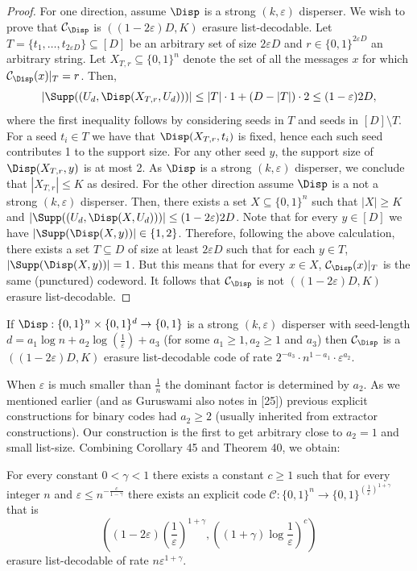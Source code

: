 \begin{proof}
For one direction, assume $\Disp$ is a strong $(k,\varepsilon)$ disperser. We wish to prove that $\mathcal C_{\Disp}$ is $((1-2\varepsilon)D,K)$ erasure list-decodable. Let $T=\{t_1,\ldots,t_{2\varepsilon D}\}\subseteq[D]$ be an arbitrary set of size $2\varepsilon D$ and $r\in\{0,1\}^{2\varepsilon D}$ an arbitrary string. Let $X_{T,r}\subseteq\{0,1\}^n$ denote the set of all the messages $x$ for which $\mathcal C_{\Disp}(x)|_T=r$. Then,
\[|\Supp((U_d,\Disp(X_{T,r},U_d)))|\le|T|\cdot1+(D-|T|)\cdot2\le(1-\varepsilon)2D,\]
where the first inequality follows by considering seeds in $T$ and seeds in $[D]\setminus T$. For a seed $t_i\in T$ we have that $\Disp(X_{T,r},t_i)$ is fixed, hence each such seed contributes 1 to the support size. For any other seed $y$, the support size of $\Disp(X_{T,r},y)$ is at most 2. As $\Disp$ is a strong $(k,\varepsilon)$ disperser, we conclude that $|X_{T,r}|\le K$ as desired.
For the other direction assume $\Disp$ is a not a strong $(k,\varepsilon)$ disperser. Then, there exists a set $X\subseteq\{0,1\}^n$ such that $|X|\ge K$ and $|\Supp((U_d,\Disp(X,U_d)))|\le(1-2\varepsilon)2D$. Note that for every $y\in[D]$ we have $|\Supp(\Disp(X,y))|\in\{1,2\}$. Therefore, following the above calculation, there exists a set $T\subseteq D$ of size at least $2\varepsilon D$ such that for each $y\in T$, $|\Supp(\Disp(X,y))|=1$. But this means that for every $x\in X$, $\mathcal C_{\Disp}(x)|_T$ is the same (punctured) codeword. It follows that $\mathcal C_{\Disp}$ is not $((1-2\varepsilon)D,K)$ erasure list-decodable.
\end{proof}
\begin{corollary}
If $\Disp:\{0,1\}^n\times\{0,1\}^d\to\{0,1\}$ is a strong $(k,\varepsilon)$ disperser with seed-length $d=a_1\log n+a_2\log(\frac1\varepsilon)+a_3$ (for some $a_1\ge1,a_2\ge1$ and $a_3$) then $\mathcal C_{\Disp}$ is a $((1-2\varepsilon)D,K)$ erasure list-decodable code of rate $2^{-a_3}\cdot n^{1-a_1}\cdot\varepsilon^{a_2}$.
\end{corollary}
When $\varepsilon$ is much smaller than $\frac1n$ the dominant factor is determined by $a_2$. As we mentioned earlier (and as Guruswami also notes in [25]) previous explicit constructions for binary codes had $a_2\ge2$ (usually inherited from extractor constructions). Our construction is the first to get arbitrary close to $a_2=1$ and small list-size. Combining Corollary 45 and Theorem 40, we obtain:
\begin{theorem}
For every constant $0<\gamma<1$ there exists a constant $c\ge1$ such that for every integer $n$ and $\varepsilon\le n^{-\frac c{1-\gamma}}$ there exists an explicit code $\mathcal C:\{0,1\}^n\to\{0,1\}^{(\frac1\varepsilon)^{1+\gamma}}$ that is
\[\left((1-2\varepsilon)\left(\frac1\varepsilon\right)^{1+\gamma},\left((1+\gamma)\log\frac1\varepsilon\right)^c\right)\]
erasure list-decodable of rate $n\varepsilon^{1+\gamma}$.
\end{theorem}
